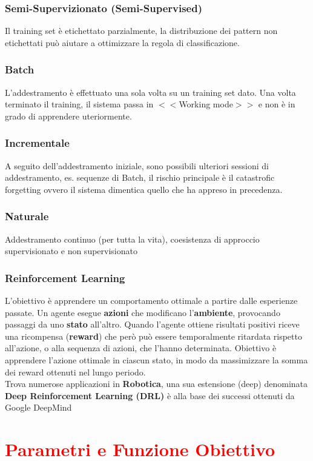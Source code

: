 \documentclass{article}
\begin{document}
\subsubsection{Semi-Supervizionato (Semi-Supervised)}
Il training set è etichettato parzialmente, la distribuzione dei pattern non etichettati può aiutare a ottimizzare la regola di classificazione.
\subsubsection{Batch}
L'addestramento è effettuato una sola volta su un training set dato. Una volta terminato il training, il sistema passa in $<<$Working mode$>>$
e non è in grado di apprendere uteriormente. 
\subsubsection{Incrementale}
A seguito dell'addestramento iniziale, sono possibili ulteriori sessioni di addestramento, es. sequenze di Batch, il rischio principale è il catastrofic forgetting ovvero il sistema dimentica quello che ha appreso in precedenza.
\subsubsection{Naturale}
Addestramento continuo (per tutta la vita), coesistenza di approccio supervisionato e non supervisionato
\subsubsection{Reinforcement Learning}
L'obiettivo è apprendere un comportamento ottimale a partire dalle esperienze passate. Un agente esegue \textbf{azioni} che modificano l'\textbf{ambiente}, provocando passaggi da uno \textbf{stato} all'altro. Quando l'agente ottiene risultati positivi riceve una ricompensa (\textbf{reward}) che però può essere temporalmente ritardata rispetto all'azione, o alla sequenza di azioni, che l'hanno determinata. Obiettivo è apprendere l'azione ottimale in ciascun stato, in modo da massimizzare la somma dei reward ottenuti nel lungo periodo.\\
Trova numerose applicazioni in \textbf{Robotica}, una sua estensione (deep) denominata \textbf{Deep Reinforcement Learning (DRL)} è alla base dei successi ottenuti da Google DeepMind
\section{\textcolor{red} {Parametri e Funzione Obiettivo}}
\end{document}
